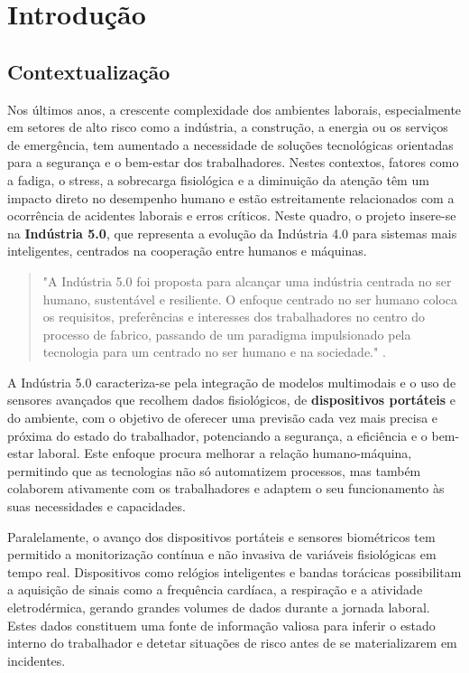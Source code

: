 \chapter{Introdução} %
\label{chap:Introducao} %

\section{Contextualização}
\label{sec:contextualizacao}

Nos últimos anos, a crescente complexidade dos ambientes laborais, especialmente em setores de alto risco como a indústria, a construção, a energia ou os serviços de emergência, tem aumentado a necessidade de soluções tecnológicas orientadas para a segurança e o bem-estar dos trabalhadores. Nestes contextos, fatores como a fadiga, o stress, a sobrecarga fisiológica e a diminuição da atenção têm um impacto direto no desempenho humano e estão estreitamente relacionados com a ocorrência de acidentes laborais e erros críticos.
Neste quadro, o projeto insere-se na \textbf{Indústria 5.0}, que representa a evolução da Indústria 4.0 para sistemas mais inteligentes, centrados na cooperação entre humanos e máquinas.

\begin{quote}
"A Indústria 5.0 foi proposta para alcançar uma indústria centrada no ser humano, sustentável e resiliente. O enfoque centrado no ser humano coloca os requisitos, preferências e interesses dos trabalhadores no centro do processo de fabrico, passando de um paradigma impulsionado pela tecnologia para um centrado no ser humano e na sociedade." \citeauthor{leng2024} \citeyear{leng2024} \cite{leng2024}.
\end{quote}

A Indústria 5.0 caracteriza-se pela integração de modelos multimodais e o uso de sensores avançados que recolhem dados fisiológicos, de \textbf{dispositivos portáteis} e do ambiente, com o objetivo de oferecer uma previsão cada vez mais precisa e próxima do estado do trabalhador, potenciando a segurança, a eficiência e o bem-estar laboral. Este enfoque procura melhorar a relação humano-máquina, permitindo que as tecnologias não só automatizem processos, mas também colaborem ativamente com os trabalhadores e adaptem o seu funcionamento às suas necessidades e capacidades.

Paralelamente, o avanço dos dispositivos portáteis e sensores biométricos tem permitido a monitorização contínua e não invasiva de variáveis fisiológicas em tempo real. Dispositivos como relógios inteligentes e bandas torácicas possibilitam a aquisição de sinais como a frequência cardíaca, a respiração e a atividade eletrodérmica, gerando grandes volumes de dados durante a jornada laboral. Estes dados constituem uma fonte de informação valiosa para inferir o estado interno do trabalhador e detetar situações de risco antes de se materializarem em incidentes.

